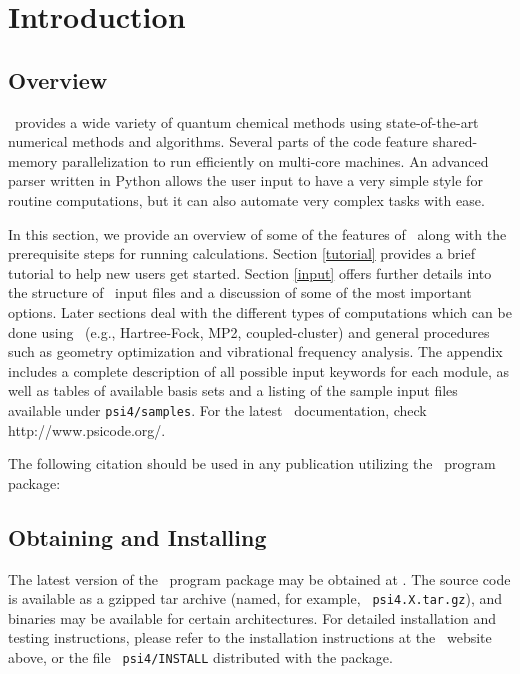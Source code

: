 \section{Introduction} \label{introduction}

\subsection{Overview} 

\PSIfour\ provides a wide variety of quantum chemical methods using
state-of-the-art numerical methods and algorithms.  Several parts of
the code feature shared-memory parallelization to run efficiently on
multi-core machines.  An advanced parser written in Python allows the user
input to have a very simple style for routine computations, but it can also
automate very complex tasks with ease. 

In this section, we provide an overview of
some of the features of \PSIfour\ along with the prerequisite steps for
running calculations.  Section \ref{tutorial} provides a brief tutorial to
help new users get started.  Section \ref{input} offers further details
into the structure of \PSIfour\ input files and a discussion of some of
the most important options.  Later sections deal with the different types
of computations which can be done using \PSIfour\ (e.g., Hartree-Fock,
MP2, coupled-cluster) and general procedures such as geometry optimization
and vibrational frequency analysis.  The appendix includes a complete
description of all possible input keywords for each module,
as well as tables of available basis sets and a listing of the sample input
files available under {\tt psi4/samples}.
For the latest \PSIfour\ documentation, check  {http://www.psicode.org/}.

The following citation should be used in any publication utilizing the
\PSIfour\ program package:

\begin{quotation}
\noindent

\end{quotation}

\subsection{Obtaining and Installing \PSIfour}
\label{installation}

The latest version of the \PSIfour\ program package may be obtained at
.  The
source code is available as a gzipped tar archive (named, for example, {\tt
psi4.X.tar.gz}), and binaries may be available for certain architectures.
For detailed installation and testing instructions, please refer to the
installation instructions at the \PSIfour\ website above, or the file {\tt
psi4/INSTALL} distributed with the package.

